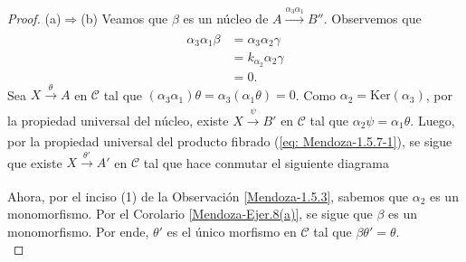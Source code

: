 \documentclass[tesis]{subfiles}
\begin{document}
\begin{proof}\leavevmode

    (a)$\Rightarrow$(b) Veamos que $\beta$ es un núcleo de $A\xrightarrow[]{\alpha_3\alpha_1}B''$. Observemos que
    \begin{align*}
        \alpha_3\alpha_1\beta &= \alpha_3\alpha_2\gamma \\
                              &= k_{\alpha_2}\alpha_2\gamma \\
                              &= 0.
    \end{align*}
    Sea $X\xrightarrow[]{\theta}A$ en $\mathscr{C}$ tal que $(\alpha_3\alpha_1)\theta=\alpha_3(\alpha_1\theta)=0$. Como $\alpha_2 = \text{Ker}(\alpha_3)$, por la propiedad universal del núcleo, existe $X\xrightarrow[]{\psi}B'$ en $\mathscr{C}$ tal que $\alpha_2\psi=\alpha_1\theta$. Luego, por la propiedad universal del producto fibrado (\ref{eq: Mendoza-1.5.7-1}), se sigue que existe $X\xrightarrow[]{\theta'}A'$ en $\mathscr{C}$ tal que hace conmutar el siguiente diagrama
    \begin{center}
    \end{center}
    Ahora, por el inciso (1) de la Observación \ref{Mendoza-1.5.3}, sabemos que $\alpha_2$ es un monomorfismo. Por el Corolario \ref{Mendoza-Ejer.8(a)}, se sigue que $\beta$ es un monomorfismo. Por ende, $\theta'$ es el único morfismo en $\mathscr{C}$ tal que $\beta\theta'=\theta$. \\


\end{proof}
\end{document}
